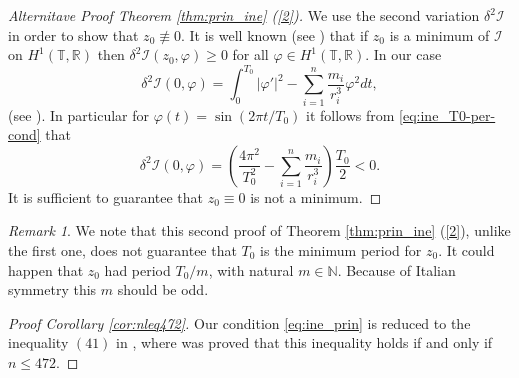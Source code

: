 \documentclass[twoside]{article}
\theoremstyle{remark}
\newtheorem{comentario}{Remark}
\newcommand{\rr}{\mathbb{R}}
\begin{document}
\begin{proof}[Alternitave Proof Theorem \ref{thm:prin_ine} (\ref{2})]
We use the second variation $\delta^2 \mathcal{I}$ in order to show  that $z_0\nequiv 0$. It is well known (see \cite[Th. 1.3.1]{jost1998calculus}) that if $z_0$ is a minimum of $\mathcal{I}$ on $H^1(\mathbb{T},\rr)$  then $\delta^2 \mathcal{I} (z_0,\varphi)\geq 0$ for all $\varphi\in H^1(\mathbb{T},\rr)$. In our case
\[\delta^2\mathcal{I}(0,\varphi)=\int_0^{T_0} |\varphi'|^2-\sum_{i=1}^{n}\frac{m_i}{r_i^3}\varphi^2 dt,\]
(see \cite[Eq. 1.3.6]{jost1998calculus}). In particular for $\varphi(t)=\sin (2\pi t/T_0)$ it follows from \eqref{eq:ine_T0-per-cond}  that
\begin{equation}\label{eq:form.delta2}
 \delta^2 \mathcal{I} (0,\varphi)=\left( \frac{4\pi^2}{T_0^2}-\sum_{i=1}^{n}\frac{m_i}{r_i^3} \right)\frac{T_0}{2}<0.
\end{equation}
It is sufficient  to guarantee that $z_0\equiv 0$ is not a minimum.
\end{proof}

\begin{comentario}
We note that this second proof of Theorem \ref{thm:prin_ine} (\ref{2}), unlike the first one, does not guarantee that $T_0$ is the minimum period for $z_0$. It could happen that $z_0$ had period $T_0/m$, with natural $m\in\mathbb{N}$. Because of Italian symmetry this $m$ should be odd.
\end{comentario}


\begin{proof}[Proof Corollary \ref{cor:nleq472}]
Our condition \eqref{eq:ine_prin} is reduced to the inequality $(41)$ in \cite{li2013characterization}, where was proved that this inequality holds if and only if $n\leq 472$.
\end{proof}
\end{document}
